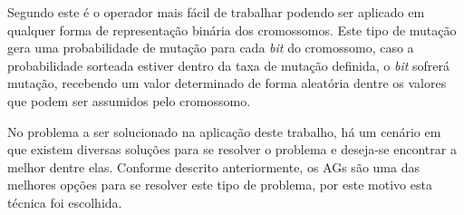 \par Segundo  este é o operador
mais fácil de trabalhar podendo ser aplicado em qualquer forma de representação
binária dos cromossomos. Este tipo de mutação gera uma probabilidade de mutação
para cada \textit{bit} do cromossomo, caso a probabilidade sorteada estiver
dentro da taxa de mutação definida, o \textit{bit} sofrerá mutação, recebendo um
valor determinado de forma aleatória dentre os valores que podem ser assumidos pelo cromossomo.


\par No problema a ser solucionado na aplicação deste trabalho, há um
cenário em que existem diversas soluções para se resolver o problema e deseja-se
encontrar a melhor dentre elas. Conforme descrito anteriormente, os AGs são uma
das melhores opções para se resolver este tipo de problema, por este motivo esta técnica foi escolhida.

% 


% 


